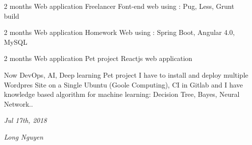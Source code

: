 \documentclass[]{friggeri-cv}
\begin{document}
\begin{entrylist}
	\entry
	    {2 months}
		{Web application}
		{Freelancer}
		{Font-end web using : Pug, Less, Grunt build}
\end{entrylist}
\begin{entrylist}
	\entry
		{2 months}
		{Web application}
		{Homework}
		{Web using : Spring Boot, Angular 4.0, MySQL}
\end{entrylist}
\begin{entrylist}
	\entry
		{2 months}
		{Web application}
		{Pet project}
		{Reactjs web application}
\end{entrylist}
\begin{entrylist}
	\entry
	{Now}
	{DevOps, AI, Deep learning}
	{Pet project}
	{I have to install and deploy multiple Wordpres Site on a Single Ubuntu (Goole Computing), CI in Gitlab and I have knowledge based algorithm for machine learning: Decision Tree, Bayes, Neural Network.. }
\end{entrylist}
\begin{flushleft}
\emph{Jul 17th, 2018}
\end{flushleft}
\begin{flushright}
\emph{Long Nguyen}
\end{flushright}
\end{document}
